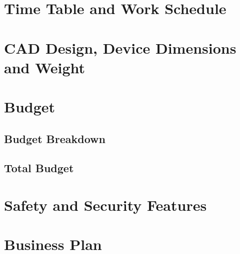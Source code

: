\documentclass[12pt,a4paper]{article}
\begin{document}
 \section{Time Table and Work Schedule}
  \begin{flushleft}
   
  \end{flushleft}
  
 \section{CAD Design, Device Dimensions and Weight}
  \begin{flushleft}
   
  \end{flushleft}

 \section{Budget}
  \subsection{Budget Breakdown}
  \subsection{Total Budget}
  
  
 \section{Safety and Security Features}
  \begin{flushleft}
   
  \end{flushleft}

 \section{Business Plan}
 \begin{flushleft}
  
 \end{flushleft}
\end{document}
